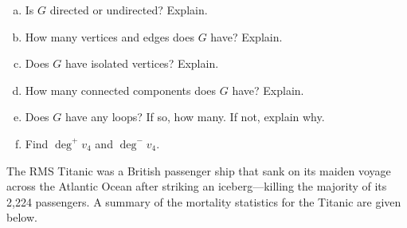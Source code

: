 \documentclass[12pt,letterpaper]{exam}
\begin{document}
\begin{questions}
\begin{enumerate}[(a)]
\item Is $G$ directed or undirected? Explain. 
\item How many vertices and edges does $G$ have? Explain. 
\item Does $G$ have isolated vertices? Explain. 
\item How many connected components does $G$ have? Explain. 
\item Does $G$ have any loops? If so, how many. If not, explain why. 
\item Find $\deg^+ v_4$ and $\deg^- v_4$. 
\end{enumerate}



\newpage



\newpage
\question[10] The RMS Titanic was a British passenger ship that sank on its maiden voyage across the Atlantic Ocean after striking an iceberg---killing the majority of its 2,224 passengers. A summary of the mortality statistics for the Titanic are given below. 
        \begin{table}[h]
        \centering
         \hfill {}
        \end{table}


\end{questions}
\end{document}
